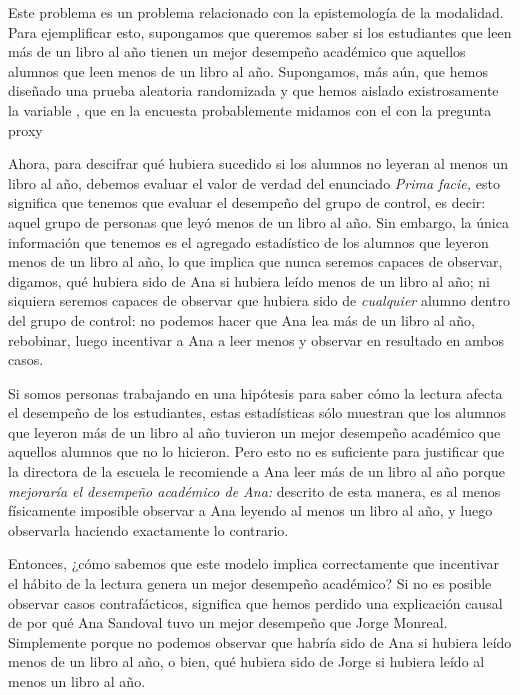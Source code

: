 {Este problema es un problema relacionado con la
epistemología de la modalidad. Para ejemplificar esto, supongamos que queremos saber si los estudiantes
que leen más de un libro al año tienen un mejor desempeño
académico que aquellos alumnos que leen menos de un libro al
año. Supongamos, más aún, que hemos diseñado una prueba
aleatoria randomizada y que hemos aislado existrosamente la
variable , que en la
encuesta probablemente midamos con el con la pregunta proxy

Ahora, para descifrar qué hubiera sucedido si los alumnos no
leyeran al menos un libro al año, debemos evaluar el valor
de verdad del enunciado  \emph{Prima facie,} esto significa que tenemos que
evaluar el desempeño del grupo de control, es decir: aquel
grupo de personas que leyó menos de un libro al año. Sin
embargo, la única información que tenemos es el agregado
estadístico de los alumnos que leyeron menos de un libro al
año, lo que implica que nunca seremos capaces de observar,
digamos, qué hubiera sido de Ana si hubiera leído menos de un
libro al año; ni siquiera seremos capaces de observar que
hubiera sido de \emph{cualquier} alumno dentro del grupo de
control: no podemos hacer que Ana lea más de un libro al
año, rebobinar, luego incentivar a Ana a leer menos y
observar en resultado en ambos casos.

Si somos personas trabajando en una hipótesis para saber
cómo la lectura afecta el desempeño de los estudiantes,
estas estadísticas sólo muestran que los alumnos que leyeron
más de un libro al año tuvieron un mejor desempeño académico
que aquellos alumnos que no lo hicieron. Pero esto no es
suficiente para justificar que la directora de la escuela le
recomiende a Ana leer más de un libro al año porque
\emph{mejoraría el desempeño académico de Ana:} descrito de
esta manera, es al menos físicamente imposible observar a
Ana leyendo al menos un libro al año, y luego observarla
haciendo exactamente lo contrario.

Entonces, ¿cómo sabemos que este modelo implica
correctamente que incentivar el hábito de la lectura genera
un mejor desempeño académico? Si no es posible observar
casos contrafácticos, significa que hemos perdido una
explicación causal de por qué Ana Sandoval tuvo un mejor
desempeño que Jorge Monreal. Simplemente porque no podemos
observar que habría sido de Ana si hubiera leído menos de un
libro al año, o bien, qué hubiera sido de Jorge si hubiera
leído al menos un libro al año.

}
